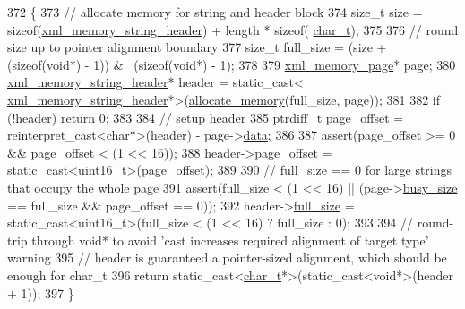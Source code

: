 \begin{DoxyCode}
372         \{
373             \textcolor{comment}{// allocate memory for string and header block}
374             \textcolor{keywordtype}{size\_t} size = \textcolor{keyword}{sizeof}(\hyperlink{structxml__memory__string__header}{xml\_memory\_string\_header}) + length * \textcolor{keyword}{sizeof}(
      \hyperlink{namespacepugi_aef5a7a62cba0507542220ea15afe39df}{char\_t});
375             
376             \textcolor{comment}{// round size up to pointer alignment boundary}
377             \textcolor{keywordtype}{size\_t} full\_size = (size + (\textcolor{keyword}{sizeof}(\textcolor{keywordtype}{void}*) - 1)) & ~(\textcolor{keyword}{sizeof}(\textcolor{keywordtype}{void}*) - 1);
378 
379             \hyperlink{structxml__memory__page}{xml\_memory\_page}* page;
380             \hyperlink{structxml__memory__string__header}{xml\_memory\_string\_header}* header = \textcolor{keyword}{static\_cast<}
      \hyperlink{structxml__memory__string__header}{xml\_memory\_string\_header}*\textcolor{keyword}{>}(\hyperlink{structxml__allocator_afac0b9fac2c2962972f60d0346eb4f39}{allocate\_memory}(full\_size, page));
381 
382             \textcolor{keywordflow}{if} (!header) \textcolor{keywordflow}{return} 0;
383 
384             \textcolor{comment}{// setup header}
385             ptrdiff\_t page\_offset = \textcolor{keyword}{reinterpret\_cast<}\textcolor{keywordtype}{char}*\textcolor{keyword}{>}(header) - page->\hyperlink{structxml__memory__page_abd99ed1563aa66fb3573a9208452685c}{data};
386 
387             assert(page\_offset >= 0 && page\_offset < (1 << 16));
388             header->\hyperlink{structxml__memory__string__header_a0cc274672f1263f73eeb6bf839bf96ee}{page\_offset} = \textcolor{keyword}{static\_cast<}uint16\_t\textcolor{keyword}{>}(page\_offset);
389 
390             \textcolor{comment}{// full\_size == 0 for large strings that occupy the whole page}
391             assert(full\_size < (1 << 16) || (page->\hyperlink{structxml__memory__page_a04780ddabc14b45baba3d1ded79d355a}{busy\_size} == full\_size && page\_offset == 0));
392             header->\hyperlink{structxml__memory__string__header_abbb48a709081e6610dffad322499e3f7}{full\_size} = \textcolor{keyword}{static\_cast<}uint16\_t\textcolor{keyword}{>}(full\_size < (1 << 16) ? full\_size : 0);
393 
394             \textcolor{comment}{// round-trip through void* to avoid 'cast increases required alignment of target type' warning}
395             \textcolor{comment}{// header is guaranteed a pointer-sized alignment, which should be enough for char\_t}
396             \textcolor{keywordflow}{return} \textcolor{keyword}{static\_cast<}\hyperlink{namespacepugi_aef5a7a62cba0507542220ea15afe39df}{char\_t}*\textcolor{keyword}{>}(\textcolor{keyword}{static\_cast<}\textcolor{keywordtype}{void}*\textcolor{keyword}{>}(header + 1));
397         \}
\end{DoxyCode}
